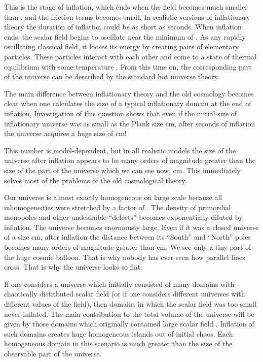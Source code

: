 \documentclass[a4paper,12pt]{article}
\begin{document}
This is the stage of inflation, which ends when the field \myHighlight{$\phi$}\coordHE{} becomes much smaller than \coordHE{}, and the friction terms becomes small. In  realistic versions of inflationary theory the  duration of inflation could be as short as \coordHE{} seconds. When inflation ends, the
scalar field \myHighlight{$\phi$}\coordHE{} begins to   oscillate near the minimum of \coordHE{}.
As any rapidly oscillating classical field, it looses its energy by
creating pairs of elementary particles. These particles interact with
each other and come to a state of thermal equilibrium with some
temperature \coordHE{}. From this time on, the corresponding part of the
universe can be described by the standard hot universe theory.


The main difference between inflationary theory and the old cosmology
becomes clear when one calculates the size of a typical inflationary
domain at the end of inflation. Investigation of this question    shows
that even if  the initial size of   inflationary universe  was as small
as the Plank size \coordHE{} cm, after \coordHE{} seconds of
inflation   the universe acquires a huge size of   \coordHE{}
cm!


This number is model-dependent, but in all realistic models the  size of
the universe after inflation appears to be many orders of magnitude
greater than the size of the part of the universe which we can see now,
\coordHE{} cm. This immediately solves most of the problems of the
old cosmological theory.

Our universe is almost exactly homogeneous on  large scale because all
inhomogeneities were stretched by a factor of \coordHE{}.  The
density of  primordial monopoles  and other undesirable ``defects''
becomes exponentially diluted by inflation.   The universe   becomes
enormously large. Even if it was a closed universe of a size
 \coordHE{} cm, after inflation the distance between its ``South'' and
``North'' poles becomes many orders of magnitude greater than \coordHE{}
cm. We see only a tiny part of the huge cosmic balloon. That is why
nobody  has ever seen how parallel lines cross. That is why the universe
looks so flat.

If one considers a universe which initially consisted of many domains
with chaotically distributed scalar field  \myHighlight{$\phi$}\coordHE{} (or if one considers
different universes with different values of the field), then  domains in
which the scalar field was too small never inflated. The main
contribution to the total volume of the universe will be given by those
domains which originally contained large scalar field \myHighlight{$\phi$}\coordHE{}. Inflation
of such domains creates huge homogeneous islands out of initial chaos.
Each  homogeneous domain in this scenario is much greater than the size
of the observable part of the universe.
\end{document}
